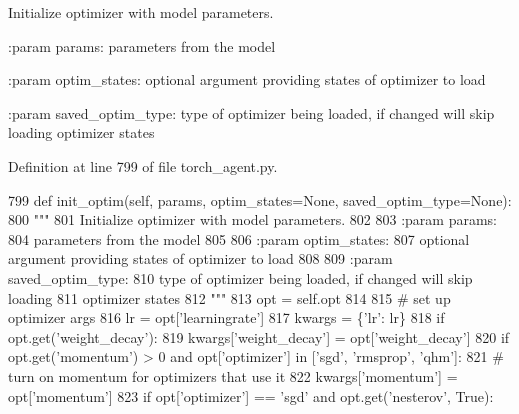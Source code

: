 \begin{DoxyVerb}Initialize optimizer with model parameters.

:param params:
    parameters from the model

:param optim_states:
    optional argument providing states of optimizer to load

:param saved_optim_type:
    type of optimizer being loaded, if changed will skip loading
    optimizer states
\end{DoxyVerb}
 

Definition at line 799 of file torch\+\_\+agent.\+py.


\begin{DoxyCode}
799     \textcolor{keyword}{def }init\_optim(self, params, optim\_states=None, saved\_optim\_type=None):
800         \textcolor{stringliteral}{"""}
801 \textcolor{stringliteral}{        Initialize optimizer with model parameters.}
802 \textcolor{stringliteral}{}
803 \textcolor{stringliteral}{        :param params:}
804 \textcolor{stringliteral}{            parameters from the model}
805 \textcolor{stringliteral}{}
806 \textcolor{stringliteral}{        :param optim\_states:}
807 \textcolor{stringliteral}{            optional argument providing states of optimizer to load}
808 \textcolor{stringliteral}{}
809 \textcolor{stringliteral}{        :param saved\_optim\_type:}
810 \textcolor{stringliteral}{            type of optimizer being loaded, if changed will skip loading}
811 \textcolor{stringliteral}{            optimizer states}
812 \textcolor{stringliteral}{        """}
813         opt = self.opt
814 
815         \textcolor{comment}{# set up optimizer args}
816         lr = opt[\textcolor{stringliteral}{'learningrate'}]
817         kwargs = \{\textcolor{stringliteral}{'lr'}: lr\}
818         \textcolor{keywordflow}{if} opt.get(\textcolor{stringliteral}{'weight\_decay'}):
819             kwargs[\textcolor{stringliteral}{'weight\_decay'}] = opt[\textcolor{stringliteral}{'weight\_decay'}]
820         \textcolor{keywordflow}{if} opt.get(\textcolor{stringliteral}{'momentum'}) > 0 \textcolor{keywordflow}{and} opt[\textcolor{stringliteral}{'optimizer'}] \textcolor{keywordflow}{in} [\textcolor{stringliteral}{'sgd'}, \textcolor{stringliteral}{'rmsprop'}, \textcolor{stringliteral}{'qhm'}]:
821             \textcolor{comment}{# turn on momentum for optimizers that use it}
822             kwargs[\textcolor{stringliteral}{'momentum'}] = opt[\textcolor{stringliteral}{'momentum'}]
823             \textcolor{keywordflow}{if} opt[\textcolor{stringliteral}{'optimizer'}] == \textcolor{stringliteral}{'sgd'} \textcolor{keywordflow}{and} opt.get(\textcolor{stringliteral}{'nesterov'}, \textcolor{keyword}{True}):

\end{DoxyCode}
